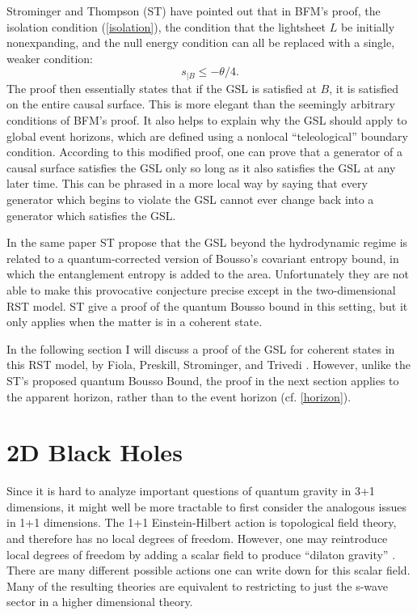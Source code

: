 \documentclass[12pt]{article}
\begin{document}
Strominger and Thompson (ST) \cite{ST04} have pointed out that in BFM's proof, the isolation condition (\ref{isolation}), the condition that the lightsheet $L$ be initially nonexpanding, and the null energy condition can all be replaced with a single, weaker condition:
\begin{equation}
s_{|B} \le -\theta/4.
\end{equation}
The proof then essentially states that if the GSL is satisfied at $B$, it is satisfied on the entire causal surface.  This is more elegant than the seemingly arbitrary conditions of BFM's proof.  It also helps to explain why the GSL should apply to global event horizons, which are defined using a nonlocal ``teleological'' boundary condition.  According to this modified proof, one can prove that a generator of a causal surface satisfies the GSL only so long as it also satisfies the GSL at any later time.  This can be phrased in a more local way by saying that every generator which begins to violate the GSL cannot ever change back into a generator which satisfies the GSL.

In the same paper ST propose that the GSL beyond the hydrodynamic regime is related to a quantum-corrected version of Bousso's covariant entropy bound, in which the entanglement entropy is added to the area.  Unfortunately they are not able to make this provocative conjecture precise except in the two-dimensional RST model.  ST give a proof of the quantum Bousso bound in this setting, but it only applies when the matter is in a coherent state.

In the following section I will discuss a proof of the GSL for coherent states in this RST model, by Fiola, Preskill, Strominger, and Trivedi \cite{fiola94}.  However, unlike the ST's proposed quantum Bousso Bound, the proof in the next section applies to the apparent horizon, rather than to the event horizon (cf. \ref{horizon}).

\section{2D Black Holes}\label{2D}

Since it is hard to analyze important questions of quantum gravity in 3+1 dimensions, it might well be more tractable to first consider the analogous issues in 1+1 dimensions.  The 1+1 Einstein-Hilbert action is topological field theory, and therefore has no local degrees of freedom.  However, one may reintroduce local degrees of freedom by adding a scalar field to produce ``dilaton gravity'' \cite{fiola94}.  There are many different possible actions one can write down for this scalar field.  Many of the resulting theories are equivalent to restricting to just the s-wave sector in a higher dimensional theory.
\end{document}
